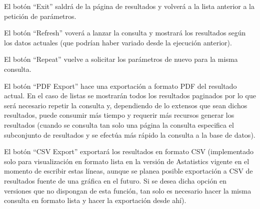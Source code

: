 \documentclass[spanish,12pt]{book}
\begin{document}
El botón ``Exit'' saldrá de la página de resultados y volverá a la lista anterior a la petición de parámetros.

El botón ``Refresh'' voverá a lanzar la consulta y mostrará los resultados según los datos actuales (que podrían haber variado desde la ejecución anterior).

El botón ``Repeat'' vuelve a solicitar los parámetros de nuevo para la misma consulta.

El botón ``PDF Export'' hace una exportación a formato PDF del resultado actual. En el caso de listas se mostrarán todos los resultados paginados por lo que será necesario repetir la consulta y, dependiendo de lo extensos que sean dichos resultados, puede consumir más tiempo y requerir más recursos generar los resultados (cuando se consulta tan solo una página la consulta especifica el subconjunto de resultados y se efectúa más rápido la consulta a la base de datos).

El botón ``CSV Export'' exportará los resultados en formato CSV (implementado solo para visualización en formato lista en la versión de Astatistics vigente en el momento de escribir estas líneas, aunque se planea posible exportación a CSV de resultados fuente de una gráfica en el futuro. Si se desea dicha opción en versiones que no dispongan de esta función, tan solo es necesario hacer la misma consulta en formato lista y hacer la exportación desde ahí).
\end{document}
